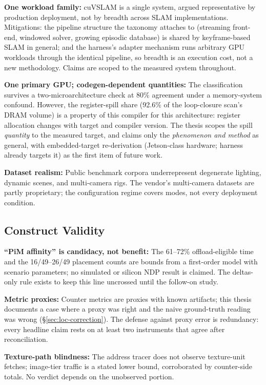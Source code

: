 \textbf{One workload family:} cuVSLAM is a single system, argued representative by production deployment, not by breadth across SLAM implementations. Mitigations: the pipeline structure the taxonomy attaches to (streaming front-end, windowed solver, growing episodic database) is shared by keyframe-based SLAM in general; and the harness's adapter mechanism runs arbitrary GPU workloads through the identical pipeline, so breadth is an execution cost, not a new methodology. Claims are scoped to the measured system throughout.

\textbf{One primary GPU; codegen-dependent quantities:} The classification survives a two-microarchitecture check at 80\% agreement under a memory-system confound. However, the register-spill share (92.6\% of the loop-closure scan's DRAM volume) is a property of this compiler for this architecture: register allocation changes with target and compiler version. The thesis scopes the spill \emph{quantity} to the measured target, and claims only the \emph{phenomenon and method} as general, with embedded-target re-derivation (Jetson-class hardware; harness already targets it) as the first item of future work.

\textbf{Dataset realism:} Public benchmark corpora underrepresent degenerate lighting, dynamic scenes, and multi-camera rigs. The vendor's multi-camera datasets are partly proprietary; the configuration regime covers modes, not every deployment condition.

\subsection{Construct Validity}

\textbf{“PiM affinity” is candidacy, not benefit:} The 61--72\% offload-eligible time and the 16/49--26/49 placement counts are bounds from a first-order model with scenario parameters; no simulated or silicon NDP result is claimed. The deltas-only rule exists to keep this line uncrossed until the follow-on study.

\textbf{Metric proxies:} Counter metrics are proxies with known artifacts; this thesis documents a case where a proxy was right and the naive ground-truth reading was wrong (\S\ref{sec:loc-correction}). The defense against proxy error is redundancy: every headline claim rests on at least two instruments that agree after reconciliation.

\textbf{Texture-path blindness:} The address tracer does not observe texture-unit fetches; image-tier traffic is a stated lower bound, corroborated by counter-side totals. No verdict depends on the unobserved portion.

